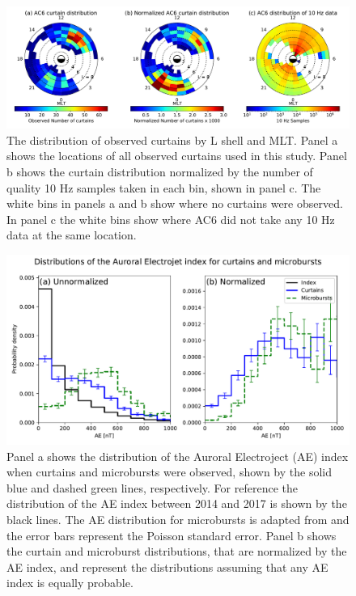 \documentclass[draft]{agujournal2019}
\begin{document}
\begin{figure}
\includegraphics[width=\textwidth]{fig2_3.pdf}
\caption{The distribution of observed curtains by L shell and MLT. Panel a shows the locations of all observed curtains used in this study. Panel b shows the curtain distribution normalized by the number of quality 10 Hz samples taken in each bin, shown in panel c. The white bins in panels a and b show where no curtains were observed. In panel c the white bins show where AC6 did not take any 10 Hz data at the same location.}
\label{l_mlt_dist}
\end{figure}

\begin{figure}
\includegraphics[width=\textwidth]{ac6_curtain_microburst_AE_dist.pdf}
\caption{Panel a shows the distribution of the Auroral Electroject (AE) index when curtains and microbursts were observed, shown by the solid blue and dashed green lines, respectively. For reference the distribution of the AE index between 2014 and 2017 is shown by the black lines. The AE distribution for microbursts is adapted from  and the error bars represent the Poisson standard error. Panel b shows the curtain and microburst distributions, that are normalized by the AE index, and represent the distributions assuming that any AE index is equally probable.}
\label{ae_dist}
\end{figure}
\end{document}

